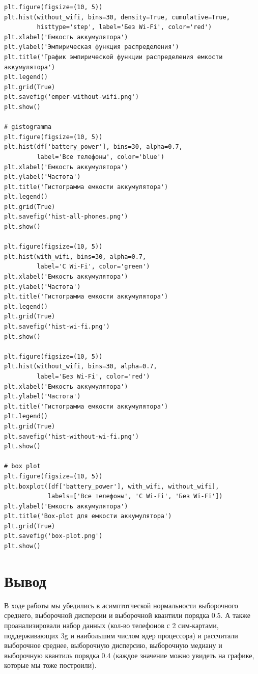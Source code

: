 \documentclass{article}
\begin{document}
\begin{verbatim}
plt.figure(figsize=(10, 5))
plt.hist(without_wifi, bins=30, density=True, cumulative=True,
         histtype='step', label='Без Wi-Fi', color='red')
plt.xlabel('Емкость аккумулятора')
plt.ylabel('Эмпирическая функция распределения')
plt.title('График эмпирической функции распределения емкости аккумулятора')
plt.legend()
plt.grid(True)
plt.savefig('emper-without-wifi.png')
plt.show()

# gistogramma
plt.figure(figsize=(10, 5))
plt.hist(df['battery_power'], bins=30, alpha=0.7,
         label='Все телефоны', color='blue')
plt.xlabel('Емкость аккумулятора')
plt.ylabel('Частота')
plt.title('Гистограмма емкости аккумулятора')
plt.legend()
plt.grid(True)
plt.savefig('hist-all-phones.png')
plt.show()

plt.figure(figsize=(10, 5))
plt.hist(with_wifi, bins=30, alpha=0.7,
         label='С Wi-Fi', color='green')
plt.xlabel('Емкость аккумулятора')
plt.ylabel('Частота')
plt.title('Гистограмма емкости аккумулятора')
plt.legend()
plt.grid(True)
plt.savefig('hist-wi-fi.png')
plt.show()

plt.figure(figsize=(10, 5))
plt.hist(without_wifi, bins=30, alpha=0.7,
         label='Без Wi-Fi', color='red')
plt.xlabel('Емкость аккумулятора')
plt.ylabel('Частота')
plt.title('Гистограмма емкости аккумулятора')
plt.legend()
plt.grid(True)
plt.savefig('hist-without-wi-fi.png')
plt.show()

# box plot
plt.figure(figsize=(10, 5))
plt.boxplot([df['battery_power'], with_wifi, without_wifi],
            labels=['Все телефоны', 'С Wi-Fi', 'Без Wi-Fi'])
plt.ylabel('Емкость аккумулятора')
plt.title('Box-plot для емкости аккумулятора')
plt.grid(True)
plt.savefig('box-plot.png')
plt.show()

\end{verbatim}

\section{Вывод}\label{sec:-no3}
В ходе работы мы убедились в асимптотческой нормальности выборочного среднего, выборочной дисперсии и
выборочной квантили порядка 0.5.
А также проанализировали набор данных (кол-во телефонов с 2 сим-картами, поддерживающих 3g и наибольшим числом
ядер процессора) и рассчитали выборочное среднее, выборочную дисперсию, выборочную медиану и
выборочную квантиль порядка 0.4 (каждое значение можно увидеть на графике, которые мы тоже построили).
\end{document}
